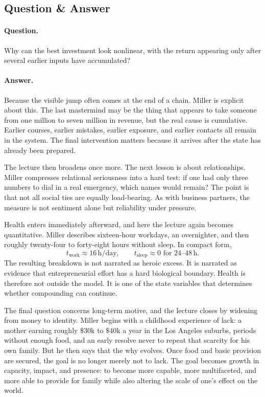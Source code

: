 \subsection{Question \& Answer}

\paragraph{Question.} Why can the best investment look nonlinear, with the return appearing only after several earlier inputs have accumulated?

\paragraph{Answer.} Because the visible jump often comes at the end of a chain. Miller is explicit about this. The last mastermind may be the thing that appears to take someone from one million to seven million in revenue, but the real cause is cumulative. Earlier courses, earlier mistakes, earlier exposure, and earlier contacts all remain in the system. The final intervention matters because it arrives after the state has already been prepared.

The lecture then broadens once more. The next lesson is about relationships. Miller compresses relational seriousness into a hard test: if one had only three numbers to dial in a real emergency, which names would remain? The point is that not all social ties are equally load-bearing. As with business partners, the measure is not sentiment alone but reliability under pressure.

Health enters immediately afterward, and here the lecture again becomes quantitative. Miller describes sixteen-hour workdays, an overnighter, and then roughly twenty-four to forty-eight hours without sleep. In compact form,
\begin{equation}
t_{\text{work}} \approx 16\,\mathrm{h/day},
\qquad
t_{\text{sleep}} \approx 0
\text{ for }24\text{--}48\,\mathrm{h}.
\end{equation}
The resulting breakdown is not narrated as heroic excess. It is narrated as evidence that entrepreneurial effort has a hard biological boundary. Health is therefore not outside the model. It is one of the state variables that determines whether compounding can continue.

The final question concerns long-term motive, and the lecture closes by widening from money to identity. Miller begins with a childhood experience of lack: a mother earning roughly \(\$30\text{k}\) to \(\$40\text{k}\) a year in the Los Angeles suburbs, periods without enough food, and an early resolve never to repeat that scarcity for his own family. But he then says that the why evolves. Once food and basic provision are secured, the goal is no longer merely not to lack. The goal becomes growth in capacity, impact, and presence: to become more capable, more multifaceted, and more able to provide for family while also altering the scale of one's effect on the world.

